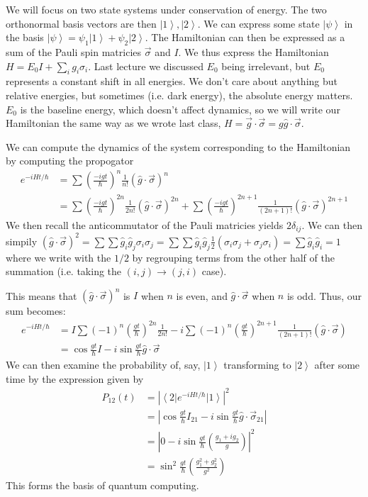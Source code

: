\documentclass[10pt]{report}
\newcommand{\bra}[1]{\left<#1\right|}
\newcommand{\ket}[1]{\left|#1\right>}
\newcommand{\abs}[1]{\left|#1\right|}
\begin{document}
We will focus on two state systems under conservation of energy. The two orthonormal basis vectors are then $\ket{1},\ket{2}$. We can express some state $\ket{\psi}$ in the basis $\ket{\psi} = \psi_1\ket{1} + \psi_2\ket{2}$. The Hamiltonian can then be expressed as a sum of the Pauli spin matricies $\vec{\sigma}$ and $I$. We thus express the Hamiltonian $H=E_0I+\sum_i g_i\sigma_i$. Last lecture we discussed $E_0$ being irrelevant, but $E_0$ represents a constant shift in all energies. We don't care about anything but relative energies, but sometimes (i.e. dark energy), the absolute energy matters. $E_0$ is the baseline energy, which doesn't affect dynamics, so we will write our Hamiltonian the same way as we wrote last class, $H=\vec{g}\cdot\vec{\sigma}=g\hat{g}\cdot\vec{\sigma}$. 

We can compute the dynamics of the system corresponding to the Hamiltonian by computing the propogator 
\begin{align}
	e^{-iHt/\hbar}&=\sum \left(\frac{-igt}{\hbar}\right)^n \frac{1}{n!}(\hat{g}\cdot\vec{\sigma})^n\\
	&= \sum \left( \frac{-igt}{\hbar} \right)^{2n} \frac{1}{2n!}(\hat{g}\cdot\vec{\sigma})^{2n} + \sum \left( \frac{-igt}{\hbar} \right)^{2n+1} \frac{1}{(2n+1)!}(\hat{g}\cdot \vec{\sigma})^{2n+1}
\end{align}
We then recall the anticommutator of the Pauli matricies yields $2\delta_{ij}$. We can then simpily $(\hat{g}\cdot\vec{\sigma})^2 = \sum \sum \hat{g}_i\hat{g}_j \sigma_i \sigma_j = \sum \sum \hat{g}_i\hat{g}_j \frac{1}{2}(\sigma_i \sigma_j + \sigma_j \sigma_i) = \sum \hat{g}_i\hat{g}_i = 1$ where we write with the $1/2$ by regrouping terms from the other half of the summation (i.e. taking the $(i,j) \to (j,i)$ case).

This means that $(\hat{g}\cdot\vec{\sigma})^n$ is $I$ when $n$ is even, and $\hat{g}\cdot\vec{\sigma}$ when $n$ is odd. Thus, our sum becomes:
\begin{align}
	e^{-iHt/\hbar}&= I\sum \left( -1 \right)^n\left( \frac{gt}{\hbar} \right)^{2n} \frac{1}{2n!} -i \sum \left( -1 \right)^n\left( \frac{gt}{\hbar} \right)^{2n+1} \frac{1}{(2n+1)!} (\hat{g}\cdot\vec{\sigma})\\
	&= \cos\frac{gt}{\hbar}I - i\sin \frac{gt}{\hbar} \hat{g}\cdot\vec{\sigma}
\end{align}
We can then examine the probability of, say, $\ket{1}$ transforming to $\ket{2}$ after some time by the expression given by 
\begin{align}
	P_{12}(t) &= \abs{\bra{2}e^{-iHt/\hbar}\ket{1}}^2 \\
	&= \abs{\cos\frac{gt}{\hbar}I_{21} - i\sin \frac{gt}{\hbar} \hat{g}\cdot\vec{\sigma}_{21}}\\
	&=\abs{0-i\sin\frac{gt}{\hbar}\left( \frac{g_1 + ig_2}{g} \right)}^2\\
	&= \sin^2\frac{gt}{\hbar}\left( \frac{g_1^2+g_2^2}{g^2} \right)
\end{align}
This forms the basis of quantum computing.
\end{document}
